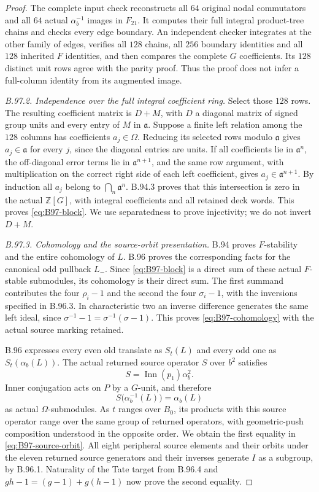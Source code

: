 \begin{proof}
The complete input check reconstructs all $64$ original nodal
commutators and all $64$ actual $\alpha_b^{-1}$ images in $F_{21}$.
It computes their full integral product-tree chains and checks every
edge boundary.  An independent checker integrates at the other
family of edges, verifies all $128$ chains, all $256$ boundary
identities and all $128$ inherited $F$ identities, and then compares
the complete $G$ coefficients.  Its $128$ distinct unit rows agree
with the parity proof.  Thus the proof does not infer a full-column
identity from its augmented image.

\emph{B.97.2. Independence over the full integral coefficient ring.}
Select those $128$ rows.  The resulting coefficient matrix is
$D+M$, with $D$ a diagonal matrix of signed group units and every
entry of $M$ in $\mathfrak a$.  Suppose a finite left relation
among the $128$ columns has coefficients $a_j\in\Omega$.
Reducing its selected rows modulo $\mathfrak a$ gives
$a_j\in\mathfrak a$ for every $j$, since the diagonal entries
are units.  If all coefficients lie in $\mathfrak a^n$, the
off-diagonal error terms lie in $\mathfrak a^{n+1}$, and the
same row argument, with multiplication on the correct right side
of each left coefficient, gives $a_j\in\mathfrak a^{n+1}$.
By induction all $a_j$ belong to $\bigcap_n\mathfrak a^n$.
B.94.3 proves that this intersection is zero in the actual
$\mathbb Z[G]$, with integral coefficients and all retained deck
words.  This proves \eqref{eq:B97-block}.  We use separatedness
to prove injectivity; we do not invert $D+M$.

\emph{B.97.3. Cohomology and the source-orbit presentation.}
B.94 proves $F$-stability and the entire cohomology of $L$.
B.96 proves the corresponding facts for the canonical odd pullback
$L_-$.  Since \eqref{eq:B97-block} is a direct sum of these actual
$F$-stable submodules, its cohomology is their direct sum.  The
first summand contributes the four $\rho_i-1$ and the second
the four $\sigma_i-1$, with the inversions specified in B.96.3.
In characteristic two an inverse difference generates the same
left ideal, since $\sigma^{-1}-1=\sigma^{-1}(\sigma-1)$.
This proves \eqref{eq:B97-cohomology} with the actual source
marking retained.

B.96 expresses every even old translate as $S_t(L)$ and every
odd one as $S_t(\alpha_b(L))$.  The actual returned source
operator $S$ over $b^2$ satisfies
\[
 S=\operatorname{Inn}(p_1)\alpha_b^2.
\]
Inner conjugation acts on $P$ by a $G$-unit, and therefore
\[
 S\bigl(\alpha_b^{-1}(L)\bigr)=\alpha_b(L)
\]
as actual $\Omega$-submodules.  As $t$ ranges over $B_0$, its
products with this source operator range over the same group of
returned operators, with geometric-push composition understood
in the opposite order.  We obtain the first equality in
\eqref{eq:B97-source-orbit}.  All eight peripheral source elements
and their orbits under the eleven returned source generators and
their inverses generate $I$ as a subgroup, by B.96.1.  Naturality
of the Tate target from B.96.4 and
$gh-1=(g-1)+g(h-1)$ now prove the second equality.


\end{proof}
